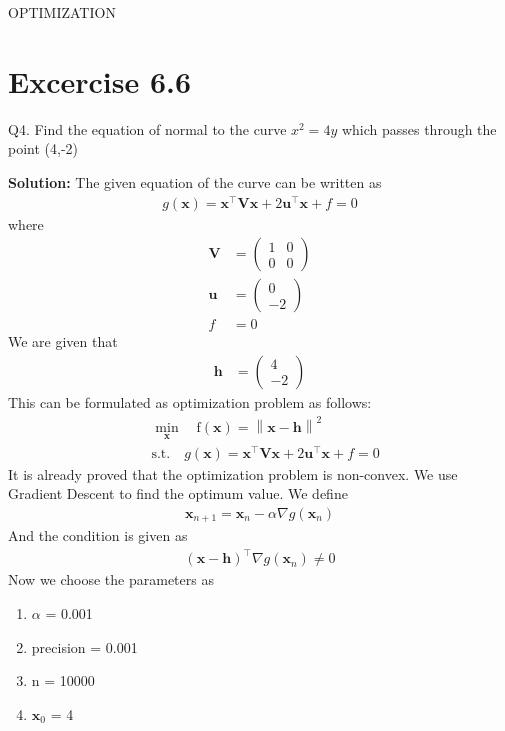 \documentclass[12pt]{article}
\providecommand{\brak}[1]{\ensuremath{\left(#1\right)}}
\providecommand{\norm}[1]{\left\lVert#1\right\rVert}
\newcommand{\solution}{\noindent \textbf{Solution: }}
\newcommand{\myvec}[1]{\ensuremath{\begin{pmatrix}#1\end{pmatrix}}}
\let\vec\mathbf
\begin{document}
\begin{center}
\textbf\large{OPTIMIZATION}

\end{center}
\section*{Excercise 6.6}

Q4. Find the equation of normal to the curve $x^2=4y$ which passes through the point (4,-2)

\solution
The given equation of the curve can be written as  
\begin{align}
	\label{eq:parabolaEq2}
	g\brak{\vec{x}} = \vec{x}^\top\vec{V}\vec{x} + 2\vec{u}^\top\vec{x} + f = 0 
\end{align}
where
\begin{align}
	\label{eq:eqV}
	\vec{V} &= \myvec{ 1 & 0 \\ 0 & 0} \\
	\label{eq:eqU}
	\vec{u} &= \myvec{0 \\ -2} \\
	\label{eq:eqF}
	f &= 0 
\end{align}
We are given that 
\begin{align}
	\vec{h} &= \myvec{4 \\ -2}
\end{align}
This can be formulated as optimization problem as follows:
\begin{align}
	\label{eq:Eq3}
	&  \min_{\vec{x}} \quad \text{f}\brak{\vec{x}} = \norm{\vec{x}-\vec{h}}^2\\
	\label{eq:Eq4}
	& \text{s.t.}\quad g\brak{\vec{x}} = \vec{x}^\top\vec{V}\vec{x} + 2\vec{u}^\top\vec{x} + f = 0  
\end{align}
It is already proved that the optimization problem is non-convex. We use Gradient Descent to find the optimum value. We define
\begin{align}
	\vec{x}_{n+1} = \vec{x}_n - \alpha\nabla g\brak{\vec{x}_n}
\end{align}
And the condition is given as 
\begin{align}
	\brak{\vec{x}-\vec{h}}^\top\nabla g\brak{\vec{x}_n} \neq 0
\end{align}
Now we choose the parameters as
\begin{enumerate}
	\item $\alpha$ = 0.001
	\item precision = 0.001
	\item n = 10000
	\item $\vec{x}_0$ = 4
\end{enumerate}
\end{document}
